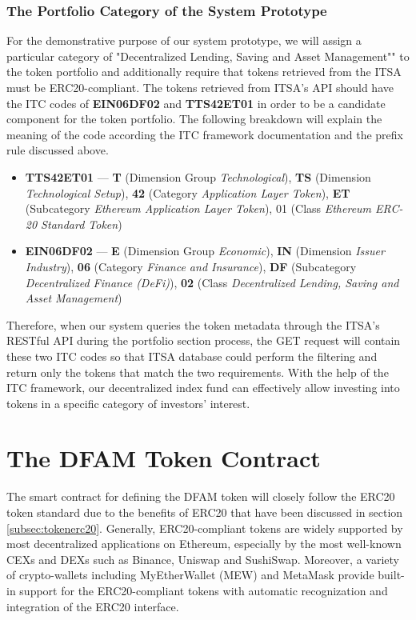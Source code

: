 \subsubsection{The Portfolio Category of the System Prototype}

For the demonstrative purpose of our system prototype, we will assign a particular category of "Decentralized Lending, Saving and Asset Management"" to the token portfolio and additionally require that tokens retrieved from the ITSA must be ERC20-compliant. The tokens retrieved from ITSA's API should have the ITC codes of \textbf{EIN06DF02} and \textbf{TTS42ET01} in order to be a candidate component for the token portfolio. The following breakdown will explain the meaning of the code according the ITC framework documentation \cite{itcDocs} and the prefix rule discussed above.

\begin{itemize}
    \item \textbf{TTS42ET01} --- \textbf{T} (Dimension Group \textit{Technological}), \textbf{TS} (Dimension \textit{Technological Setup}), \textbf{42} (Category \textit{Application Layer Token}), \textbf{ET} (Subcategory \textit{Ethereum Application Layer Token}), 01 (Class \textit{Ethereum ERC-20 Standard Token})
    
    \item \textbf{EIN06DF02} --- \textbf{E} (Dimension Group \textit{Economic}), \textbf{IN} (Dimension \textit{Issuer Industry}), \textbf{06} (Category \textit{Finance and Insurance}), \textbf{DF} (Subcategory \textit{Decentralized Finance (DeFi)}), \textbf{02} (Class \textit{Decentralized Lending, Saving and Asset Management})
\end{itemize}

Therefore, when our system queries the token metadata through the ITSA's RESTful API during the portfolio section process, the GET request will contain these two ITC codes so that ITSA database could perform the filtering and return only the tokens that match the two requirements. With the help of the ITC framework, our decentralized index fund can effectively allow investing into tokens in a specific category of investors' interest.



\section{The DFAM Token Contract} \label{sec:indextoken}

The smart contract for defining the DFAM token will closely follow the ERC20 token standard due to the benefits of ERC20 that have been discussed in section \ref{subsec:tokenerc20}. Generally, ERC20-compliant tokens are widely supported by most decentralized applications  on Ethereum, especially by the most well-known CEXs and DEXs such as Binance, Uniswap and SushiSwap. Moreover, a variety of crypto-wallets including MyEtherWallet (MEW) and MetaMask provide built-in support for the ERC20-compliant tokens with automatic recognization and integration of the ERC20 interface.

